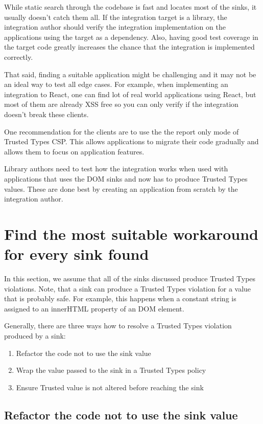 While static search through the codebase is fast and locates most of the sinks, it usually doesn't
catch them all. If the integration target is a library, the integration author should verify the
integration implementation on the applications using the target as a dependency. Also, having good
test coverage in the target code greatly increases the chance that the integration is
implemented correctly.

That said, finding a suitable application might be challenging and it may not be an ideal way to
test all edge cases. For example, when implementing an integration to React, one can find lot of
real world applications using React, but most of them are already XSS free so you can only verify if
the integration doesn't break these clients.

One recommendation for the clients are to use the the report only mode of Trusted Types CSP. This
allows applications to migrate their code gradually and allows them to focus on application
features.

Library authors need to test how the integration works when used with applications that uses the
DOM sinks and now has to produce Trusted Types values. These are done best by creating an
application from scratch by the integration author.

\section{Find the most suitable workaround for every sink found}

In this section, we assume that all of the sinks discussed produce Trusted Types violations. Note,
that a sink can produce a Trusted Types violation for a value that is probably safe. For example, this happens
when a constant string is assigned to an innerHTML property of an DOM element.

Generally, there are three ways how to resolve a Trusted Types violation produced by a sink:

\begin{enumerate}
  \item Refactor the code not to use the sink value
  \item Wrap the value passed to the sink in a Trusted Types policy
  \item Ensure Trusted value is not altered before reaching the sink
\end{enumerate}

\subsection{Refactor the code not to use the sink value}

